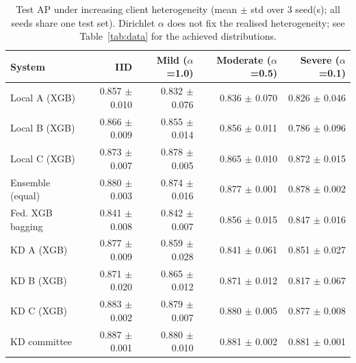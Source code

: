 \begin{table}[t]
\centering
\scriptsize
\caption{Test AP under increasing client heterogeneity (mean $\pm$ std over 3 seed(s); all seeds share one test set). Dirichlet $\alpha$ does not fix the realised heterogeneity; see Table~\ref{tab:data} for the achieved distributions.}
\label{tab:noniid}
\begin{tabular}{lrrrr}
\toprule
System & IID & Mild ($\alpha$=1.0) & Moderate ($\alpha$=0.5) & Severe ($\alpha$=0.1) \\
\midrule
Local A (XGB) & 0.857 $\pm$ 0.010 & 0.832 $\pm$ 0.076 & 0.836 $\pm$ 0.070 & 0.826 $\pm$ 0.046 \\
Local B (XGB) & 0.866 $\pm$ 0.009 & 0.855 $\pm$ 0.014 & 0.856 $\pm$ 0.011 & 0.786 $\pm$ 0.096 \\
Local C (XGB) & 0.873 $\pm$ 0.007 & 0.878 $\pm$ 0.005 & 0.865 $\pm$ 0.010 & 0.872 $\pm$ 0.015 \\
Ensemble (equal) & 0.880 $\pm$ 0.003 & 0.874 $\pm$ 0.016 & 0.877 $\pm$ 0.001 & 0.878 $\pm$ 0.002 \\
Fed. XGB bagging & 0.841 $\pm$ 0.008 & 0.842 $\pm$ 0.007 & 0.856 $\pm$ 0.015 & 0.847 $\pm$ 0.016 \\
KD A (XGB) & 0.877 $\pm$ 0.009 & 0.859 $\pm$ 0.028 & 0.841 $\pm$ 0.061 & 0.851 $\pm$ 0.027 \\
KD B (XGB) & 0.871 $\pm$ 0.020 & 0.865 $\pm$ 0.012 & 0.871 $\pm$ 0.012 & 0.817 $\pm$ 0.067 \\
KD C (XGB) & 0.883 $\pm$ 0.002 & 0.879 $\pm$ 0.007 & 0.880 $\pm$ 0.005 & 0.877 $\pm$ 0.008 \\
KD committee & 0.887 $\pm$ 0.001 & 0.880 $\pm$ 0.010 & 0.881 $\pm$ 0.002 & 0.881 $\pm$ 0.001 \\
\bottomrule
\end{tabular}
\end{table}
